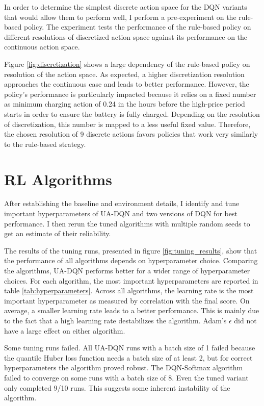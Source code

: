 In order to determine the simplest discrete action space for the DQN variants that would allow them to perform well, I perform a pre-experiment on the rule-based policy.
The experiment tests the performance of the rule-based policy on different resolutions of discretized action space against its performance on the continuous action space.

Figure \ref{fig:discretization} shows a large dependency of the rule-based policy on resolution of the action space.
As expected, a higher discretization resolution approaches the continuous case and leads to better performance.
However, the policy's performance is particularly impacted because it relies on a fixed number as minimum charging action of 0.24 in the hours before the high-price period starts in order to ensure the battery is fully charged.
Depending on the resolution of discretization, this number is mapped to a less useful fixed value.
Therefore, the chosen resolution of 9 discrete actions favors policies that work very similarly to the rule-based strategy.

\section{RL Algorithms}
After establishing the baseline and environment details, I identify and tune important hyperparameters of UA-DQN and two versions of DQN for best performance.
I then rerun the tuned algorithms with multiple random seeds to get an estimate of their reliability.

The results of the tuning runs, presented in figure \ref{fig:tuning_results}, show that the performance of all algorithms depends on hyperparameter choice.
Comparing the algorithms, UA-DQN performs better for a wider range of hyperparameter choices.
For each algorithm, the most important hyperparameters are reported in table \ref{tab:hyperparameters}.
Across all algorithms, the learning rate is the most important hyperparameter as measured by correlation with the final score.
On average, a smaller learning rate leads to a better performance.
This is mainly due to the fact that a high learning rate destabilizes the algorithm.
Adam's $\epsilon$ did not have a large effect on either algorithm.

Some tuning runs failed. All UA-DQN runs with a batch size of 1 failed because the quantile Huber loss function needs a batch size of at least 2, but for correct hyperparameters the algorithm proved robust.
The DQN-Softmax algorithm failed to converge on some runs with a batch size of 8. Even the tuned variant only completed 9/10 runs. This suggests some inherent instability of the algorithm.

